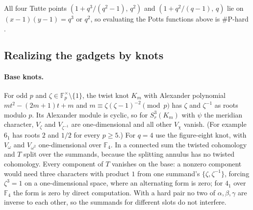 \documentclass[11pt]{article}
\theoremstyle{definition}
\theoremstyle{remark}
\newcommand{\F}{\mathbb{F}}
\newcommand{\sharpP}{\#\mathrm{P}}
\begin{document}
All four Tutte points $(1+q^3/(q^2-1),\,q^2)$ and $(1+q^2/(q-1),\,q)$ lie on
$(x-1)(y-1)=q^3$ or $q^2$, so evaluating the Potts functions above is
$\sharpP$-hard \cite{JVW90}.

\subsection{Realizing the gadgets by knots}

\paragraph{Base knots.} For odd $p$ and $\zeta\in\F_p^\times\setminus\{1\}$,
the twist knot $K_m$ with Alexander polynomial $mt^2-(2m+1)t+m$ and
$m\equiv\zeta(\zeta-1)^{-2}\pmod p$ has $\zeta$ and $\zeta^{-1}$ as roots
modulo $p$. Its Alexander module is cyclic, so for $S^3_r(K_m)$ with $\psi$
the meridian character, $V_\zeta$ and $V_{\zeta^{-1}}$ are one-dimensional and
all other $V_\chi$ vanish. (For example $6_1$ has roots $2$ and $1/2$ for
every $p\ge5$.) For $q=4$ use the figure-eight knot, with $V_{\omega}$ and
$V_{\omega^2}$ one-dimensional over $\F_4$. In a connected sum the twisted
cohomology and $T$ split over the summands, because the splitting annulus has
no twisted cohomology. Every component of $T$ vanishes on the base: a nonzero
component would need three characters with product $1$ from one summand's
$\{\zeta,\zeta^{-1}\}$, forcing $\zeta^3=1$ on a one-dimensional space, where an
alternating form is zero; for $4_1$ over $\F_4$ the form is zero by direct
computation. With a hard pair no two of $\alpha,\beta,\gamma$ are inverse to
each other, so the summands for different slots do not interfere.
\end{document}
